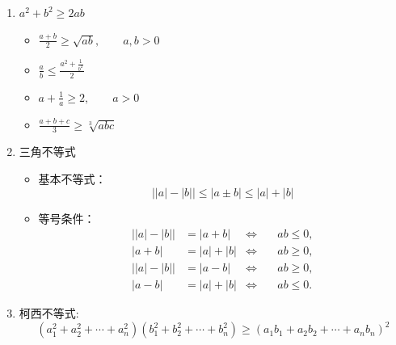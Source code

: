 \documentclass[../book.tex]{subfiles}
\begin{document}
\begin{enumerate}
        \[
            \text{调和平均值}
            \;\leq\;
            \text{几何平均值}
            \;\leq\;
            \text{算术平均值}
            \;\leq\;
            \text{均方根}
        \]
        \item $a^2 + b^2 \geq 2ab$
        \begin{itemize}
            \item $\displaystyle \frac{a + b}{2} \geq \sqrt{ab}, \qquad a,b > 0$
            \item $\displaystyle \frac{a}{b} \leq \frac{a^2 + \displaystyle \frac{1}{b^2}}{2}$
            \item $\displaystyle a + \frac{1}{a} \geq 2, \qquad a>0$
            \item $\displaystyle \frac{a + b + c}{3} \geq \sqrt[3]{abc}$
        \end{itemize}
        \item 三角不等式
        \begin{itemize}
            \item 基本不等式：
            \[
                \bigl||a| - |b|\bigr| \le |a \pm b| \le |a| + |b|
            \]
            \item 等号条件：
            \begin{align*}
                \bigl||a| - |b|\bigr| &= |a + b| &\Leftrightarrow\quad & ab \le 0,\\
                |a + b| &= |a| + |b| &\Leftrightarrow\quad & ab \ge 0,\\
                \bigl||a| - |b|\bigr| &= |a - b| &\Leftrightarrow\quad & ab \ge 0,\\
                |a - b| &= |a| + |b| &\Leftrightarrow\quad & ab \le 0.
            \end{align*}
        \end{itemize}

        \item 柯西不等式:
        \[
            \left(a_1^2 + a_2^2 + \cdots + a_n^2\right)
            \left(b_1^2 + b_2^2 + \cdots + b_n^2\right)
            \geq
            \left(a_1 b_1 + a_2 b_2 + \cdots + a_n b_n\right)^2
        \]


\end{enumerate}
\end{document}
